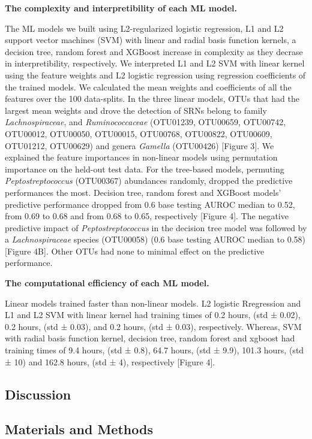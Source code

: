 \documentclass[11pt,]{article}
\begin{document}
\textbf{The complexity and interpretibility of each ML model.}

The ML models we built using L2-regularized logistic regression, L1 and
L2 support vector machines (SVM) with linear and radial basis function
kernels, a decision tree, random forest and XGBoost increase in
complexity as they decrase in interpretibility, respectively. We
interpreted L1 and L2 SVM with linear kernel using the feature weights
and L2 logistic regression using regression coefficients of the trained
models. We calculated the mean weights and coefficients of all the
features over the 100 data-splits. In the three linear models, OTUs that
had the largest mean weights and drove the detection of SRNs belong to
family \emph{Lachnospiraceae}, and \emph{Ruminococcaceae} (OTU01239,
OTU00659, OTU00742, OTU00012, OTU00050, OTU00015, OTU00768, OTU00822,
OTU00609, OTU01212, OTU00629) and genera \emph{Gamella} (OTU00426)
{[}Figure 3{]}. We explained the feature importances in non-linear
models using permutation importance on the held-out test data. For the
tree-based models, permuting \emph{Peptostreptococcus} (OTU00367)
abundances randomly, dropped the predictive performances the most.
Decision tree, random forest and XGBoost models' predictive performance
dropped from 0.6 base testing AUROC median to 0.52, from 0.69 to 0.68
and from 0.68 to 0.65, respectively {[}Figure 4{]}. The negative
predictive impact of \emph{Peptostreptococcus} in the decision tree
model was followed by a \emph{Lachnospiraceae} species (OTU00058) (0.6
base testing AUROC median to 0.58) {[}Figure 4B{]}. Other OTUs had none
to minimal effect on the predictive performance.

\textbf{The computational efficiency of each ML model.}

Linear models trained faster than non-linear models. L2 logistic
Rregression and L1 and L2 SVM with linear kernel had training times of
0.2 hours, (std ± 0.02), 0.2 hours, (std ± 0.03), and 0.2 hours, (std ±
0.03), respectively. Whereas, SVM with radial basis function kernel,
decision tree, random forest and xgboost had training times of 9.4
hours, (std ± 0.8), 64.7 hours, (std ± 9.9), 101.3 hours, (std ± 10) and
162.8 hours, (std ± 4), respectively {[}Figure 4{]}.

\subsection{Discussion}\label{discussion}

\subsection{Materials and Methods}\label{materials-and-methods}
\end{document}
